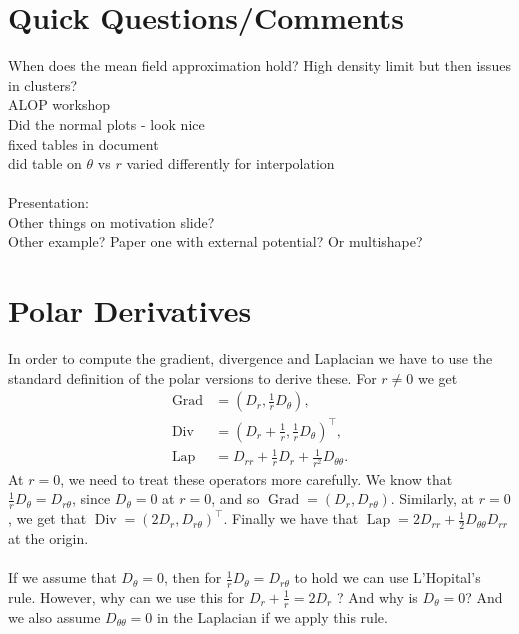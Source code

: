 \documentclass[11pt, a4paper]{article}
\theoremstyle{definition}
\DeclareMathOperator{\Grad}{Grad}
\DeclareMathOperator{\Div}{Div}
\DeclareMathOperator{\Lap}{Lap}
\begin{document}
	
\section{Quick Questions/Comments}
When does the mean field approximation hold? High density limit but then issues in clusters?\\
ALOP workshop	\\
Did the normal plots - look nice\\
fixed tables in document\\
did table on $\theta$ vs $r$ varied differently for interpolation\\
\\
Presentation:\\
Other things on motivation slide?\\
Other example? Paper one with external potential? Or multishape?
\section{Polar Derivatives}
In order to compute the gradient, divergence and Laplacian we have to use the standard definition of the polar versions to derive these. For $ r \neq 0$ we get
\begin{align*}
	\Grad  &= \left(D_r, \frac{1}{r} D_\theta\right) ,\\
	\Div &= \left(D_r + \frac{1}{r}, \frac{1}{r} D_\theta\right)^\top ,\\
	\Lap  &= D_{rr} +\frac{1}{r}D_r +  \frac{1}{r^2} D_{\theta \theta}.
\end{align*}
At $ r = 0$, we need to treat these operators more carefully. We know that $\frac{1}{r} D_\theta = D_{r\theta}$, since $D_\theta =0$ at $r = 0$, and so $ \Grad = \left(D_r, D_{r\theta}\right)$. Similarly, at $r = 0$, we get that $\Div = \left(2D_r, D_{r\theta}\right)^\top$. Finally we have that $\Lap = 2 D_{rr} + \frac{1}{2} D_{\theta\theta}D_{rr}$ at the origin. \\
\\
If we assume that $D_\theta =0$, then for $\frac{1}{r} D_\theta = D_{r\theta}$ to hold we can use L'Hopital's rule. 
However, why can we use this for $D_r + \frac{1}{r} = 2D_r$ ? And why is $D_\theta =0$? And we also assume $D_{\theta \theta}=0$ in the Laplacian if we apply this rule. 
\end{document}
